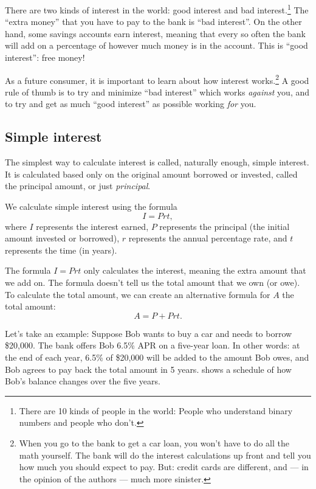 There are two kinds of interest in the world: good interest and bad interest.\footnote{There are 10 kinds of people in the world: People who understand binary numbers and people who don't.} The ``extra money'' that you have to pay to the bank is ``bad interest''. On the other hand, some savings accounts earn interest, meaning that every so often the bank will add on a percentage of however much money is in the account. This is ``good interest'': free money!

As a future consumer, it is important to learn about how interest works.\footnote{When you go to the bank to get a car loan, you won't have to do all the math yourself. The bank will do the interest calculations up front and tell you how much you should expect to pay. But: credit cards are different, and --- in the opinion of the authors --- much more sinister.} A good rule of thumb is to try and minimize ``bad interest'' which works \textit{against} you, and to try and get as much ``good interest'' as possible working \textit{for} you.

\subsection{Simple interest}

The simplest way to calculate interest is called, naturally enough, \gls{simple interest}. It is calculated based only on the original amount borrowed or invested, called the \gls{principal amount}, or just \textit{principal}.

\begin{boxdef}
We calculate simple interest using the formula \[I = Prt,\] where $I$ represents the interest earned, $P$ represents the principal (the initial amount invested or borrowed), $r$ represents the annual percentage rate, and $t$ represents the time (in years).
\end{boxdef}

The formula $I=Prt$ only calculates the interest, meaning the extra amount that we add on. The formula doesn't tell us the total amount that we own (or owe). To calculate the total amount, we can create an alternative formula for $A$ the total amount: \[A = P +Prt.\]

Let's take an example: Suppose Bob wants to buy a car and needs to borrow \$20,000. The bank offers Bob 6.5\% APR on a five-year loan. In other words: at the end of each year, 6.5\% of \$20,000 will be added to the amount Bob owes, and Bob agrees to pay back the total amount in 5 years.  shows a schedule of how Bob's balance changes over the five years.

